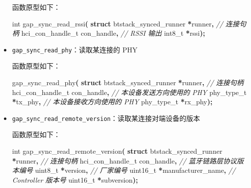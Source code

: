 \documentclass[
  12pt,
]{book}
\newenvironment{Shaded}{\begin{snugshade}}{\end{snugshade}}
\newcommand{\CommentTok}[1]{\textcolor[rgb]{0.56,0.35,0.01}{\textit{#1}}}
\newcommand{\DataTypeTok}[1]{\textcolor[rgb]{0.13,0.29,0.53}{#1}}
\newcommand{\KeywordTok}[1]{\textcolor[rgb]{0.13,0.29,0.53}{\textbf{#1}}}
\newcommand{\NormalTok}[1]{#1}
\newcommand{\OperatorTok}[1]{\textcolor[rgb]{0.81,0.36,0.00}{\textbf{#1}}}
\begin{document}
\begin{itemize}
  函数原型如下：

\begin{Shaded}
\begin{Highlighting}[]
\DataTypeTok{int}\NormalTok{ gap\_sync\_read\_rssi}\OperatorTok{(}
  \KeywordTok{struct}\NormalTok{ btstack\_synced\_runner }\OperatorTok{*}\NormalTok{runner}\OperatorTok{,}
  \CommentTok{// 连接句柄}
\NormalTok{  hci\_con\_handle\_t con\_handle}\OperatorTok{,}
  \CommentTok{// RSSI 输出}
  \DataTypeTok{int8\_t} \OperatorTok{*}\NormalTok{rssi}\OperatorTok{);}
\end{Highlighting}
\end{Shaded}
\item
  \texttt{gap\_sync\_read\_phy}：读取某连接的 PHY

  函数原型如下：

\begin{Shaded}
\begin{Highlighting}[]
\NormalTok{gap\_sync\_read\_phy}\OperatorTok{(}
  \KeywordTok{struct}\NormalTok{ btstack\_synced\_runner }\OperatorTok{*}\NormalTok{runner}\OperatorTok{,}
  \CommentTok{// 连接句柄}
\NormalTok{  hci\_con\_handle\_t con\_handle}\OperatorTok{,}
  \CommentTok{// 本设备发送方向使用的 PHY}
\NormalTok{  phy\_type\_t }\OperatorTok{*}\NormalTok{tx\_phy}\OperatorTok{,}
  \CommentTok{// 本设备接收方向使用的 PHY}
\NormalTok{  phy\_type\_t }\OperatorTok{*}\NormalTok{rx\_phy}\OperatorTok{);}
\end{Highlighting}
\end{Shaded}
\item
  \texttt{gap\_sync\_read\_remote\_version}：读取某连接对端设备的版本

  函数原型如下：

\begin{Shaded}
\begin{Highlighting}[]
\DataTypeTok{int}\NormalTok{ gap\_sync\_read\_remote\_version}\OperatorTok{(}
  \KeywordTok{struct}\NormalTok{ btstack\_synced\_runner }\OperatorTok{*}\NormalTok{runner}\OperatorTok{,}
  \CommentTok{// 连接句柄}
\NormalTok{  hci\_con\_handle\_t con\_handle}\OperatorTok{,}
  \CommentTok{// 蓝牙链路层协议版本编号}
  \DataTypeTok{uint8\_t} \OperatorTok{*}\NormalTok{version}\OperatorTok{,}
  \CommentTok{// 厂家编号}
  \DataTypeTok{uint16\_t} \OperatorTok{*}\NormalTok{manufacturer\_name}\OperatorTok{,}
  \CommentTok{// Controller 版本号}
  \DataTypeTok{uint16\_t} \OperatorTok{*}\NormalTok{subversion}\OperatorTok{);}
\end{Highlighting}
\end{Shaded}


\end{itemize}
\end{document}
